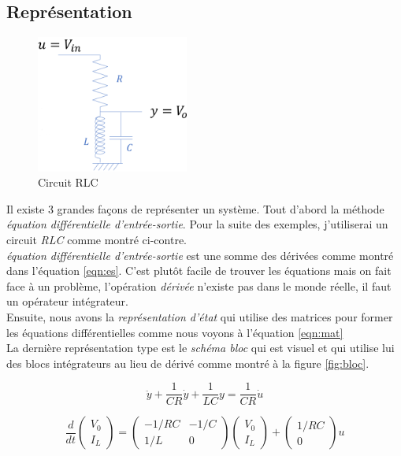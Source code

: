 \documentclass{report}
\begin{document}
\subsection{Représentation}
\begin{figure}
\includegraphics[width=5cm]{img/RLC.png}
\caption{Circuit RLC}
\label{fig:RLC}
\end{figure}
Il existe 3 grandes façons de représenter un système. Tout d'abord la méthode \textit{équation différentielle d'entrée-sortie}. Pour la suite des exemples, j'utiliserai un circuit \textit{RLC} comme montré ci-contre.\\

\textit{équation différentielle d'entrée-sortie} est une somme des dérivées comme montré dans l'équation \ref{eqn:es}. C'est plutôt facile de trouver les équations mais on fait face à un problème, l'opération \textit{dérivée} n'existe pas dans le monde réelle, il faut un opérateur intégrateur.\\

Ensuite, nous avons la \textit{représentation d'état} qui utilise des matrices pour former les équations différentielles comme nous voyons à l'équation \ref{eqn:mat}\\

La dernière représentation type est le \textit{schéma bloc} qui est visuel et qui utilise lui des blocs intégrateurs au lieu de dérivé comme montré à la figure \ref{fig:bloc}.

\begin{equation} \label{eqn:es}
\ddot{y} + \frac{1}{CR}\dot{y} + \frac{1}{LC}y = \frac{1}{CR}\dot{u}
\end{equation}

\begin{equation} \label{eqn:mat}
\frac{d}{dt}\begin{pmatrix}
V_0\\
I_L
\end{pmatrix} = \begin{pmatrix}
-1/RC & -1/C\\
1/L & 0
\end{pmatrix} \begin{pmatrix}
V_0\\
I_L
\end{pmatrix} + \begin{pmatrix}
1/RC\\
0
\end{pmatrix} u
\end{equation}
\end{document}
